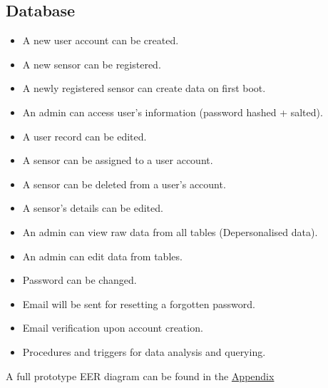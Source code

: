 \documentclass{article}
\begin{document}
            \subsection{Database}
            \begin{itemize}
                \item A new user account can be created.
                \item A new sensor can be registered.
                \item A newly registered sensor can create data on first boot.
                \item An admin can access user’s information (password hashed + salted).
                \item A user record can be edited.
                \item A sensor can be assigned to a user account.
                \item A sensor can be deleted from a user’s account.
                \item A sensor’s details can be edited.
                \item An admin can view raw data from all tables (Depersonalised data).
                \item An admin can edit data from tables.
                \item Password can be changed.
                \item Email will be sent for resetting a forgotten password.
                \item Email verification upon account creation.
                \item Procedures and triggers for data analysis and querying.
            \end{itemize}
            A full prototype EER diagram can be found in the \hyperref[sec:Appendix]{Appendix}
            
            \newpage
\end{document}
